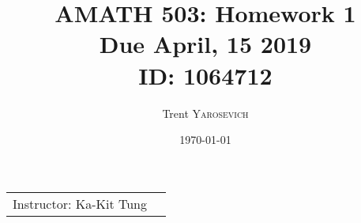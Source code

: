 \documentclass{article}
\title{AMATH 503: Homework 1 \\Due April, 15 2019 \\ ID: 1064712} %
\author{Trent \textsc{Yarosevich}} %
\date{\today} %
\begin{document}
\maketitle %
\setlength\parindent{1cm}

\begin{center}
\begin{tabular}{l r}
Instructor: Ka-Kit Tung %
\end{tabular}
\end{center}


\end{document}
